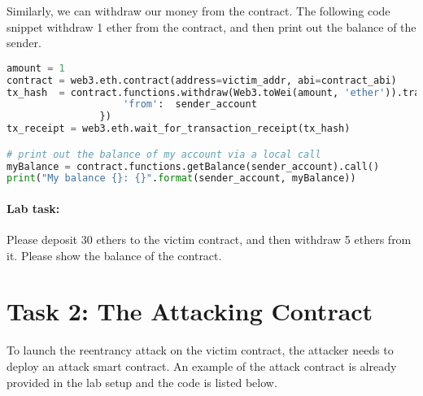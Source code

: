 Similarly, we can withdraw our money from the contract. 
The following code snippet withdraw 1 ether from the contract,
and then print out the balance of the sender.  

\begin{lstlisting}[language=python,
        caption=Withdraw money (\texttt{withdraw\_from\_victim\_contract.py})]
amount = 1
contract = web3.eth.contract(address=victim_addr, abi=contract_abi)
tx_hash  = contract.functions.withdraw(Web3.toWei(amount, 'ether')).transact({
                    'from':  sender_account
                })
tx_receipt = web3.eth.wait_for_transaction_receipt(tx_hash)

# print out the balance of my account via a local call
myBalance = contract.functions.getBalance(sender_account).call()
print("My balance {}: {}".format(sender_account, myBalance))
\end{lstlisting}


\paragraph{Lab task:} 
Please deposit 30 ethers to the victim contract, and then
withdraw 5 ethers from it. Please show the balance 
of the contract. 
 



\section{Task 2: The Attacking Contract} 


To launch the reentrancy attack on the victim contract, the attacker
needs to deploy an attack smart contract. An example of the 
attack contract is already provided in the lab setup 
and the code is listed below. 


